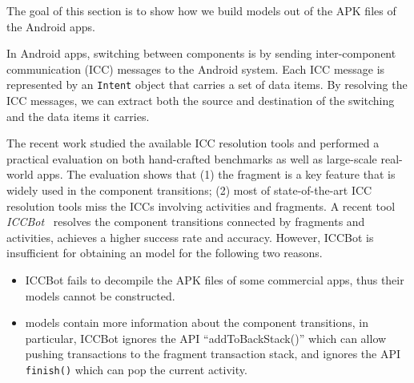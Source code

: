 

The goal of this section is to show how we build {\AMASS} models out of the APK files of the Android apps.


In Android apps, switching between components is by sending inter-component communication (ICC) messages to the Android system. 
Each ICC message is represented by an \texttt{Intent} object that carries a set of data items.
By resolving 
the ICC messages, we can extract both the source and destination of %
the switching and the data items it carries.  


The recent work \cite{YZ+22} studied the available ICC resolution tools and performed a practical evaluation on both hand-crafted benchmarks as well as large-scale real-world apps.
The evaluation shows that (1) the fragment is a key feature that is widely used in the component transitions; (2) most of state-of-the-art ICC resolution tools miss the ICCs involving activities and fragments. 
A recent %
tool \textit{ICCBot}~\cite{ICCBot_paper} %
resolves the component transitions connected by fragments and activities,  %
achieves a higher success rate and accuracy.
% 
However, ICCBot is insufficient for obtaining an {\AMASS} model for the following two reasons. %
\begin{itemize}
\item ICCBot fails to decompile the APK files of some commercial apps, thus their models cannot be constructed. 
%
\item {\AMASS} models contain more information about the component transitions, in particular, ICCBot ignores the API ``addToBackStack()'' which can allow pushing transactions to the fragment transaction stack, and ignores the API \texttt{finish()} which can pop the current activity.
%
\end{itemize}

